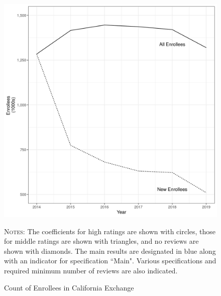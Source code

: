 \documentclass[12pt]{article}
\begin{document}
\begin{figure}[htb]\caption{Count of Enrollees in California Exchange}
\centering
 		\hspace*{-1cm}\includegraphics[scale=.7]{figures/enrollee_count.png}
 		\begin{minipage}{\textwidth}
		\bigskip
			\footnotesize \textsc{Notes:} The coefficients for high ratings are shown with circles, those for middle ratings are shown with triangles, and no reviews are shown with diamonds. The main results are designated in blue along with an indicator for specification ``Main". Various specifications and required minimum number of reviews are also indicated. 
 		\end{minipage}
 		\label{figure:SpecCurve}
 \end{figure}
\end{document}
